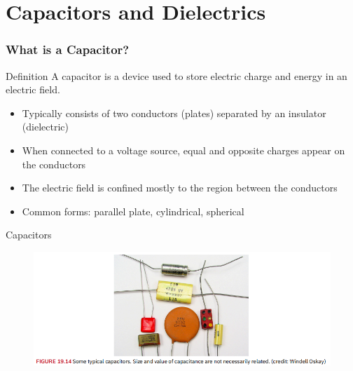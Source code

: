 \documentclass{beamer}
\begin{document}
\section{Capacitors and Dielectrics}

\begin{frame}
    \frametitle{What is a Capacitor?}
    
    \begin{block}{Definition}
        A capacitor is a device used to store electric charge and energy in an electric field.
    \end{block}
    
    \begin{itemize}
        \item Typically consists of two conductors (plates) separated by an insulator (dielectric)
        \item When connected to a voltage source, equal and opposite charges appear on the conductors
        \item The electric field is confined mostly to the region between the conductors
        \item Common forms: parallel plate, cylindrical, spherical
    \end{itemize}
    \end{frame}

\begin{frame}{Capacitors}
    \begin{figure}
        \centering
        \includegraphics[width=1\linewidth]{phys12-circuits-capacitor-types.png}
    \end{figure}
\end{frame}
\end{document}
